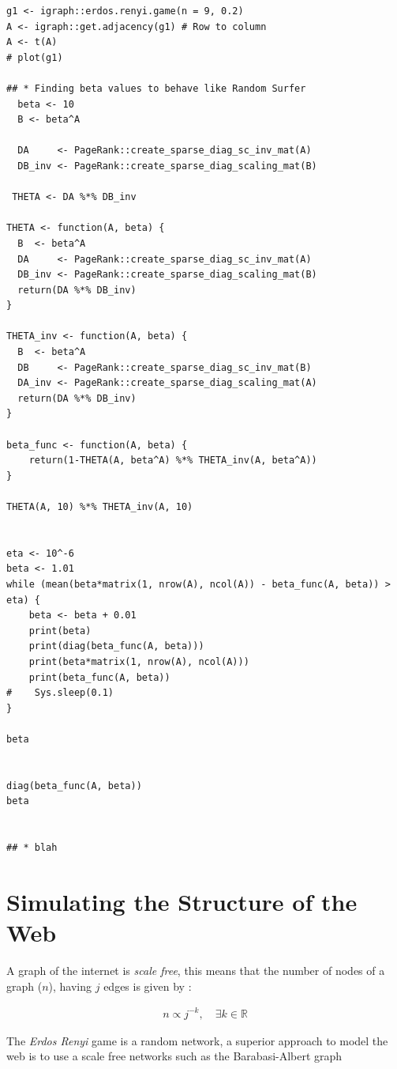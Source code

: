 \documentclass[11pt]{article}
\begin{document}
\lstset{language=r,label= ,caption= ,captionpos=b,numbers=none}
\begin{lstlisting}
g1 <- igraph::erdos.renyi.game(n = 9, 0.2)
A <- igraph::get.adjacency(g1) # Row to column
A <- t(A)
# plot(g1)

## * Finding beta values to behave like Random Surfer
  beta <- 10
  B <- beta^A

  DA     <- PageRank::create_sparse_diag_sc_inv_mat(A)
  DB_inv <- PageRank::create_sparse_diag_scaling_mat(B)

 THETA <- DA %*% DB_inv

THETA <- function(A, beta) {
  B  <- beta^A
  DA     <- PageRank::create_sparse_diag_sc_inv_mat(A)
  DB_inv <- PageRank::create_sparse_diag_scaling_mat(B)
  return(DA %*% DB_inv)
}

THETA_inv <- function(A, beta) {
  B  <- beta^A
  DB     <- PageRank::create_sparse_diag_sc_inv_mat(B)
  DA_inv <- PageRank::create_sparse_diag_scaling_mat(A)
  return(DA %*% DB_inv)
}

beta_func <- function(A, beta) {
    return(1-THETA(A, beta^A) %*% THETA_inv(A, beta^A))
}

THETA(A, 10) %*% THETA_inv(A, 10)


eta <- 10^-6
beta <- 1.01
while (mean(beta*matrix(1, nrow(A), ncol(A)) - beta_func(A, beta)) > eta) {
    beta <- beta + 0.01
    print(beta)
    print(diag(beta_func(A, beta)))
    print(beta*matrix(1, nrow(A), ncol(A)))
    print(beta_func(A, beta))
#    Sys.sleep(0.1)
}

beta


diag(beta_func(A, beta))
beta


## * blah
\end{lstlisting}
\section{Simulating the Structure of the Web}
\label{sec:org74e2f40}
A graph of the internet is \emph{scale free}, this means that the number of nodes of a graph (\(n\)), having \(j\) edges is given by \cite[.2]{langvilleGooglePageRankScience2012}:

\begin{align}
n \propto j^{-k}, \quad \exists k \in \mathbb{R}
\end{align}

The \emph{Erdos Renyi} game is a random network, a superior approach to model the web is to use a scale free networks \cite{barabasiPhysicsWeb2001} such as the Barabasi-Albert graph \cite{barabasiScalefreeCharacteristicsRandom2000}
\end{document}
